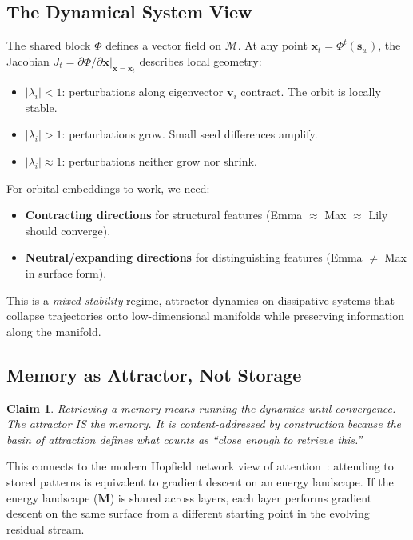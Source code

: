 \documentclass[11pt, a4paper]{article}
\newcommand{\M}{\mathbf{M}}
\newcommand{\x}{\mathbf{x}}
\newcommand{\s}{\mathbf{s}}
\newtheorem{claim}{Claim}
\theoremstyle{remark}
\begin{document}
\subsection{The Dynamical System View}

The shared block $\Phi$ defines a vector field on $\mathcal{M}$.
At any point $\x_t = \Phi^t(\s_w)$, the Jacobian $J_t = \partial \Phi / \partial \x |_{\x = \x_t}$ describes local geometry:
\begin{itemize}[nosep]
    \item $|\lambda_i| < 1$: perturbations along eigenvector $\mathbf{v}_i$ contract. The orbit is locally stable.
    \item $|\lambda_i| > 1$: perturbations grow. Small seed differences amplify.
    \item $|\lambda_i| \approx 1$: perturbations neither grow nor shrink.
\end{itemize}

For orbital embeddings to work, we need:
\begin{itemize}[nosep]
    \item \textbf{Contracting directions} for structural features (Emma $\approx$ Max $\approx$ Lily should converge).
    \item \textbf{Neutral/expanding directions} for distinguishing features (Emma $\neq$ Max in surface form).
\end{itemize}

This is a \emph{mixed-stability} regime, attractor dynamics on dissipative systems that collapse trajectories onto low-dimensional manifolds while preserving information along the manifold.

\subsection{Memory as Attractor, Not Storage}

\begin{claim}
Retrieving a memory means running the dynamics until convergence.
The attractor IS the memory.
It is content-addressed by construction because the basin of attraction defines what counts as ``close enough to retrieve this.''
\end{claim}

This connects to the modern Hopfield network view of attention~\cite{ramsauer2021hopfield}: attending to stored patterns is equivalent to gradient descent on an energy landscape.
If the energy landscape ($\M$) is shared across layers, each layer performs gradient descent on the same surface from a different starting point in the evolving residual stream.
\end{document}

